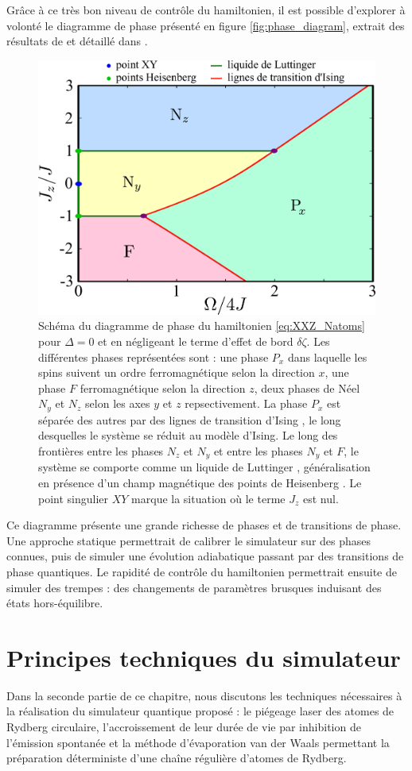 Grâce à ce très bon niveau de contrôle du hamiltonien, il est possible d'explorer à volonté le diagramme de phase présenté en figure \eqref{fig:phase_diagram}, extrait des résultats de \cite{MX_DMITRIEV02} et détaillé dans \cite{ENS_PRE_CIRCSIM}.
%
\begin{figure}[!h]
\centering
\includegraphics[width=0.7\linewidth]{figures/circsim/phase_diagram}
\caption[Diagramme de phase XXZ]{
Schéma du diagramme de phase du hamiltonien \eqref{eq:XXZ_Natoms} pour $\Delta=0$ et en négligeant le terme d'effet de bord $\delta\zeta$.
Les différentes phases représentées sont : une phase $P_x$ dans laquelle les spins suivent un ordre ferromagnétique selon la direction $x$, une phase $F$ ferromagnétique selon la direction $z$, deux phases de Néel $N_y$ et $N_z$ selon les axes $y$ et $z$ repsectivement.
La phase $P_x$ est séparée des autres par des lignes \og de transition d'Ising \fg{}, le long desquelles le système se réduit au modèle d'Ising.
Le long des frontières entre les phases $N_z$ et $N_y$ et entre les phases $N_y$ et $F$, le système se comporte comme un \og liquide de Luttinger \fg{}, généralisation en présence d'un champ magnétique des \og points de Heisenberg \fg{}.
Le point singulier $XY$ marque la situation où le terme $J_z$ est nul.
}
\label{fig:phase_diagram}
\end{figure}
%
Ce diagramme présente une grande richesse de phases et de transitions de phase.
Une approche statique permettrait de calibrer le simulateur sur des phases connues, puis de simuler une évolution adiabatique passant par des transitions de phase quantiques.
Le rapidité de contrôle du hamiltonien permettrait ensuite de simuler des trempes : des changements de paramètres brusques induisant des états hors-équilibre.

\section{Principes techniques du simulateur}
\noindent Dans la seconde partie de ce chapitre, nous discutons les techniques nécessaires à la réalisation du simulateur quantique proposé :
le piégeage laser des atomes de Rydberg circulaire, l'accroissement de leur durée de vie par inhibition de l'émission spontanée et la méthode d'\og évaporation van der Waals \fg{} permettant la préparation déterministe d'une chaîne régulière d'atomes de Rydberg.

